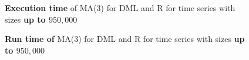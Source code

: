 \begin{figure}[ht]
	\centering
	\caption{\textbf{Execution time} of MA(3) for DML and R for time series with sizes \textbf{up to $950,000$} }
    \label{apx-fig:ma3-exectime-scatter-all}
\end{figure}

\begin{figure}[ht]
	\centering
	\caption{\textbf{Run time of} MA(3) for DML and R for time series with sizes \textbf{up to $950,000$} }
    \label{apx-fig:ma3-runtime-scatter-all}
\end{figure}

